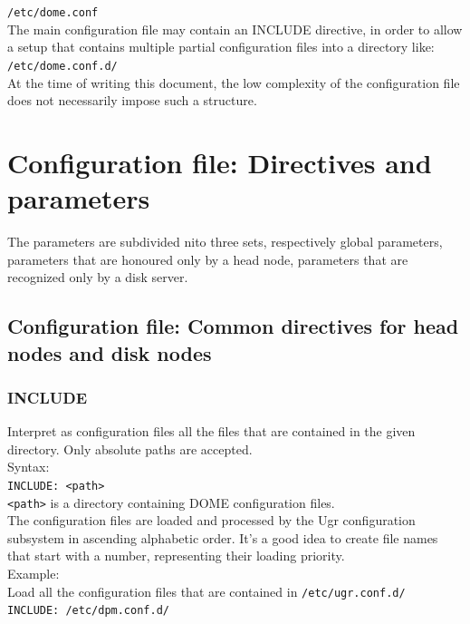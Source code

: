 \documentclass[a4paper,10pt]{scrreprt}
\begin{document}
\lstinline"/etc/dome.conf"\\

The main configuration file may contain an INCLUDE directive, in order to allow a setup that contains multiple partial configuration files into a directory like:\\

\lstinline"/etc/dome.conf.d/"\\

At the time of writing this document, the low complexity of the configuration file does not necessarily impose such a structure.

\section{Configuration file: Directives and parameters}
The parameters are subdivided nito three sets, respectively global parameters, parameters that are honoured only by a head node, parameters that are recognized only by a disk server.



\subsection{Configuration file: Common directives for head nodes and disk nodes}

\subsubsection{INCLUDE}
Interpret as configuration files all the files that are contained in the given directory.
Only absolute paths are accepted.\\

Syntax:\\

\lstinline"INCLUDE: <path>"\\

\lstinline"<path>" is a directory containing DOME configuration files.\\

The configuration files are loaded and processed by the Ugr configuration subsystem
in ascending alphabetic order. It's a good idea to create file names that start with a number,
representing their loading priority.\\

Example:\\
Load all the configuration files that are contained in \lstinline"/etc/ugr.conf.d/"\\
\lstinline"INCLUDE: /etc/dpm.conf.d/"
\end{document}
